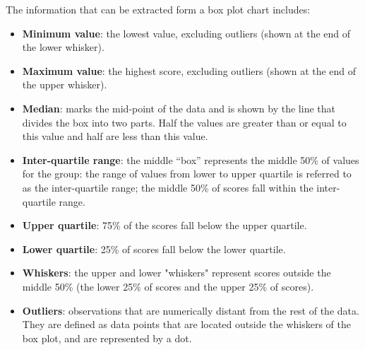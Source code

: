 The information that can be extracted form a box plot chart includes:
\begin{itemize}
    \item \textbf{Minimum value}: the lowest value, excluding outliers (shown at the end of the lower whisker).
    \item \textbf{Maximum value}: the highest score, excluding outliers (shown at the end of the upper whisker).
    \item \textbf{Median}: marks the mid-point of the data and is shown by the line that divides the box into two parts. Half the values are greater than or equal to this value and half are less than this value.
    \item \textbf{Inter-quartile range}: the middle “box” represents the middle 50\% of values for the group: the range of values from lower to upper quartile is referred to as the inter-quartile range; the middle 50\% of scores fall within the inter-quartile range.
    \item \textbf{Upper quartile}: 75\% of the scores fall below the upper quartile.
    \item \textbf{Lower quartile}: 25\% of scores fall below the lower quartile.
    \item \textbf{Whiskers}: the upper and lower "whiskers" represent scores outside the middle 50\% (\ie the lower 25\% of scores and the upper 25\% of scores).
    \item \textbf{Outliers}: observations that are numerically distant from the rest of the data. They are defined as data points that are located outside the whiskers of the box plot, and are represented by a dot.
\end{itemize}



